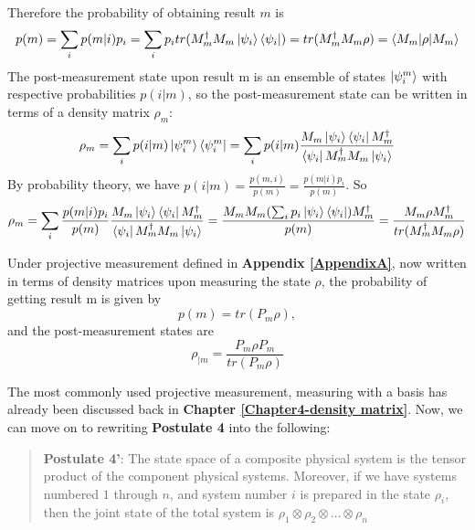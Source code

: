     Therefore the probability of obtaining result $m$ is
    \begin{equation}
        p(m)=\sum_i p(m|i)p_i=\sum_i p_i tr(M_m^\dagger M_m \ket{\psi_i}\bra{\psi_i})=tr(M_m^\dagger M_m \rho)=\braket{M_m| \rho |M_m}
    \end{equation}
    The post-measurement state upon result m is an ensemble of states $\ket{\psi_i^m}$ with respective probabilities $p(i|m)$, so the post-measurement state can be written in terms of a density matrix $\rho_m$:
    \begin{equation}
        \rho_m = \sum_i p(i|m)\ket{\psi_i^m}\bra{\psi_i^m}=\sum_i p(i|m)\frac{M_m \ket{\psi_i}\bra{\psi_i}M_m^\dagger}{\bra{\psi_i}M_m^\dagger M_m \ket{\psi_i}}
    \end{equation}
    By probability theory, we have $p(i|m)=\frac{p(m,i)}{p(m)}=\frac{p(m|i)p_i}{p(m)}$. So
    \begin{equation}
        \rho_m=\sum_i \frac{p(m|i)p_i}{p(m)}\frac{M_m \ket{\psi_i}\bra{\psi_i}M_m^\dagger}{\bra{\psi_i}M_m^\dagger M_m \ket{\psi_i}}=\frac{M_m M_m (\sum_i p_i \ket{\psi_i}\bra{\psi_i})M_m^\dagger}{p(m)}=\frac{M_m \rho M_m^\dagger}{tr(M_m^\dagger M_m \rho)}
    \end{equation}

\bigskip
Under projective measurement defined in \textbf{Appendix \ref{AppendixA}}, now written in terms of density matrices upon measuring the state $\rho$, the probability of getting result m is given by
\begin{equation}
    p(m)=tr(P_m \rho),
\end{equation}
and the post-measurement states are
\begin{equation}
    \rho_{|m}=\frac{P_m \rho P_m}{tr(P_m \rho)}
\end{equation}

The most commonly used projective measurement, measuring with a basis has already been discussed back in \textbf{Chapter \ref{Chapter4-density matrix}}. Now, we can move on to rewriting \textbf{Postulate 4} into the following:

\bigskip
\begin{quote}
    \textbf{Postulate 4'}: The state space of a composite physical system is the tensor product of the component physical systems. Moreover, if we have systems numbered $1$ through $n$, and system number $i$ is prepared in the state $\rho_i$, then the joint state of the total system is $\rho_1 \otimes \rho_2 \otimes \hdots \otimes \rho_n$
\end{quote}

